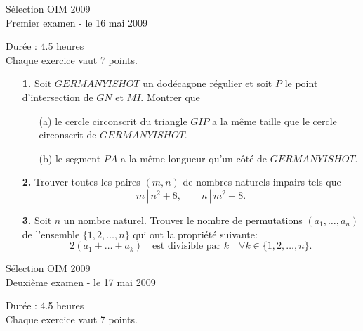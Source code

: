 \documentclass[12pt,a4paper]{article}
\theoremstyle{plain}
\theoremstyle{definition}
\theoremstyle{remark}
\renewcommand{\div}{\, | \,}
\begin{document}
\pagestyle{empty}

\begin{center}
{\huge S\'election OIM 2009} \\
\medskip Premier examen - le 16 mai 2009
\end{center}
\vspace{8mm}
Dur\'ee : 4.5 heures\\
Chaque exercice vaut 7 points.

\vspace{15mm}

\begin{enumerate}

\item[\textbf{1.}] Soit $GERMANYISHOT$ un dod\'ecagone r\'egulier et soit $P$ le point d'intersection de $GN$ et $MI$. Montrer que
\begin{enumerate}
\item[(a)] le cercle circonscrit du triangle $GIP$ a la m\^eme taille que le cercle circonscrit de $GERMANYISHOT$.
\item[(b)] le segment $PA$ a la m\^eme longueur qu'un c\^ot\'e de $GERMANYISHOT$.
\end{enumerate}


\bigskip
\bigskip

\item[\textbf{2.}] Trouver toutes les paires $(m,n)$ de nombres naturels impairs tels que
\[m \div n^2+8, \qquad n \div m^2+8.\]


\bigskip
\bigskip

\item[\textbf{3.}] Soit $n$ un nombre naturel. Trouver le nombre de permutations $(a_1,\ldots,a_n)$ 
de l'ensemble $\{1,2,\ldots, n\}$ qui ont la propri\'et\'e suivante:
\[2(a_1+\ldots +a_k) \quad \mbox{est divisible par $k$} \quad \forall k\in \{1,2,\ldots ,n\}.\]


\end{enumerate}

\pagebreak


\begin{center}
{\huge S\'election OIM 2009} \\
\medskip Deuxi\`eme examen - le 17 mai 2009
\end{center}
\vspace{8mm}
Dur\'ee : 4.5 heures\\
Chaque exercice vaut 7 points.

\vspace{15mm}
\end{document}
